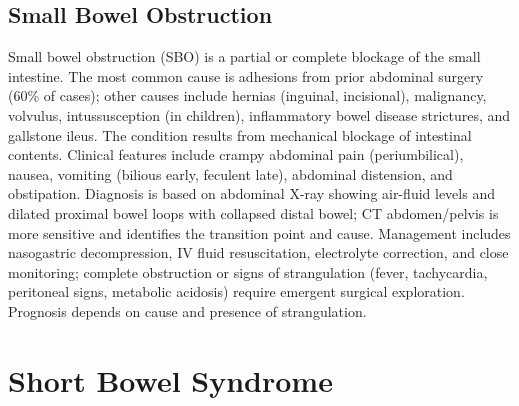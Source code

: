 \subsection{Small Bowel Obstruction}
\label{sec:Small Bowel Obstruction}
Small bowel obstruction (SBO) is a partial or complete blockage of the small intestine. The most common cause is adhesions from prior abdominal surgery (60\% of cases); other causes include hernias (inguinal, incisional), malignancy, volvulus, intussusception (in children), inflammatory bowel disease strictures, and gallstone ileus. The condition results from mechanical blockage of intestinal contents. Clinical features include crampy abdominal pain (periumbilical), nausea, vomiting (bilious early, feculent late), abdominal distension, and obstipation. Diagnosis is based on abdominal X-ray showing air-fluid levels and dilated proximal bowel loops with collapsed distal bowel; CT abdomen/pelvis is more sensitive and identifies the transition point and cause. Management includes nasogastric decompression, IV fluid resuscitation, electrolyte correction, and close monitoring; complete obstruction or signs of strangulation (fever, tachycardia, peritoneal signs, metabolic acidosis) require emergent surgical exploration. Prognosis depends on cause and presence of strangulation.

\section{Short Bowel Syndrome}








\label{sec:section:Short Bowel Syndrome}

